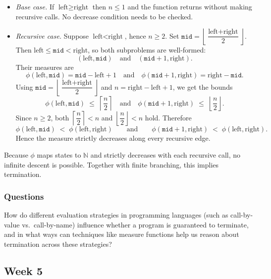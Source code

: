 \documentclass{article}
\theoremstyle{theorem}
\theoremstyle{definition}
\theoremstyle{remark}
\begin{document}
\begin{itemize}
  \item \emph{Base case.} If \(\text{left}\ge \text{right}\) then \(n\le 1\) and the function returns without making recursive calls. No decrease condition needs to be checked.

  \item \emph{Recursive case.} Suppose \(\text{left}<\text{right}\), hence \(n\ge 2\).
  Set \(\texttt{mid}=\left\lfloor \dfrac{\text{left}+\text{right}}{2}\right\rfloor\).
  Then \(\text{left}\le \texttt{mid}<\text{right}\), so both subproblems are well-formed:
  \[
  (\text{left},\texttt{mid}) \quad\text{and}\quad (\texttt{mid}+1,\text{right}).
  \]
  Their measures are
  \[
  \phi(\text{left},\texttt{mid})=\texttt{mid}-\text{left}+1
  \quad\text{and}\quad
  \phi(\texttt{mid}+1,\text{right})=\text{right}-\texttt{mid}.
  \]
  Using \(\texttt{mid}=\left\lfloor \dfrac{\text{left}+\text{right}}{2}\right\rfloor\) and \(n=\text{right}-\text{left}+1\), we get the bounds
  \[
  \phi(\text{left},\texttt{mid}) \;\le\; \left\lceil \frac{n}{2} \right\rceil
  \quad\text{and}\quad
  \phi(\texttt{mid}+1,\text{right}) \;\le\; \left\lfloor \frac{n}{2} \right\rfloor.
  \]
  Since \(n\ge 2\), both \(\left\lceil \dfrac{n}{2}\right\rceil<n\) and \(\left\lfloor \dfrac{n}{2}\right\rfloor<n\) hold. Therefore
  \[
  \phi(\text{left},\texttt{mid}) \;<\; \phi(\text{left},\text{right})
  \qquad\text{and}\qquad
  \phi(\texttt{mid}+1,\text{right}) \;<\; \phi(\text{left},\text{right}).
  \]
  Hence the measure strictly decreases along every recursive edge.
\end{itemize}

Because \(\phi\) maps states to \(\mathbb{N}\) and strictly decreases with each recursive call,
no infinite descent is possible. Together with finite branching, this implies termination.

\subsubsection{Questions}

How do different evaluation strategies in programming languages (such as call-by-value vs.\ call-by-name) influence whether a program is guaranteed to terminate, and in what ways can techniques like measure functions help us reason about termination across these strategies?

\subsection{Week 5}
\end{document}
